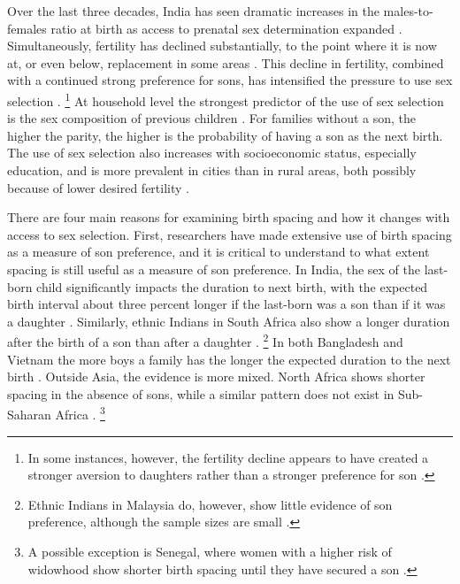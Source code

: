 \documentclass[12pt,letterpaper]{article}
\begin{document}
Over the last three decades, India has seen dramatic increases in the males-to-females 
ratio at birth as access to prenatal sex determination expanded 
\citep{das_gupta97,Sudha1999,Arnold2002,retherford03b,jha06,Guilmoto2012,Portner2015b}.
Simultaneously, fertility has declined substantially, to the point where it is now at, or 
even below, replacement in some areas 
\citep{Guilmoto2013,Dharmalingam2014,International-Institute-for-Population-Sciences-IIPS2017}.
This decline in fertility, combined with a continued strong preference for sons, has 
intensified the pressure to use sex selection 
\citep{das_gupta97,Guilmoto2009a,Bongaarts2013,Jayachandran2017}.%
\footnote{
In some instances, however, the fertility decline appears to have created a stronger 
aversion to daughters rather than a stronger preference for son \citet{DiamondSmith2008}.
}
At household level the strongest predictor of the use of sex selection is the sex 
composition of previous children \citep{retherford03b,jha06,abrevaya09,Portner2015b}.
For families without a son, the higher the parity, the higher is the probability
of having a son as the next birth.
The use of sex selection also increases with socioeconomic status, especially 
education, and is more prevalent in cities than in rural areas, both possibly because 
of lower desired fertility \citep{retherford03b,jha06,Portner2015b}.


There are four main reasons for examining birth spacing and how it changes with 
access to sex selection.
First, researchers have made extensive use of birth spacing as a measure of son preference, 
and it is critical to understand to what extent spacing is still useful as a measure of son 
preference.
In India, the sex of the last-born child significantly impacts the duration to next birth,
with the expected birth interval about three percent longer if the last-born was a son than
if it was a daughter \citep{Bhalotra2008,Kumar2016}.
Similarly, ethnic Indians in South Africa also show a longer duration after the birth of a 
son than after a daughter \citep{Gangadharan2003}.%
\footnote{
Ethnic Indians in Malaysia do, however, show little evidence of son preference, although
the sample sizes are small \citep{Pong1994}.
}
In both Bangladesh and Vietnam the more boys a family has the longer the expected duration 
to the next birth \citep{Haughton1995,Haughton1996,Rahman1993,Soest2018}.
Outside Asia, the evidence is more mixed.
North Africa shows shorter spacing in the absence of sons, while a similar pattern does
not exist in Sub-Saharan Africa \citep{Rossi2015}.%
\footnote{
A possible exception is Senegal, where women with a higher risk of widowhood show
shorter birth spacing until they have secured a son \citep{Lambert2016}.
}
\end{document}
